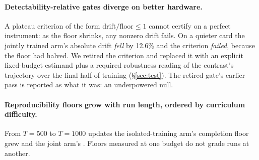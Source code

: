 \paragraph{Detectability-relative gates diverge on better hardware.} A plateau
criterion of the form $\mathrm{drift}/\mathrm{floor} \le 1$ cannot certify on
a perfect instrument: as the floor shrinks, any nonzero drift fails. On a
quieter card the jointly trained arm's absolute drift \emph{fell} by 12.6\%
and the criterion \emph{failed}, because the floor had halved. We retired the
criterion and replaced it with an explicit fixed-budget estimand plus a
required robustness reading of the contrast's trajectory over the final half
of training (\S\ref{sec:test}). The retired gate's earlier pass is reported as
what it was: an underpowered null.

\paragraph{Reproducibility floors grow with run length, ordered by curriculum
difficulty.} From $T = 500$ to $T = 1000$ updates the isolated-training arm's
completion floor grew  and the joint arm's
. Floors measured at one budget do not grade runs at
another.
